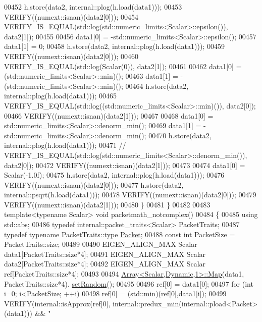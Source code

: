 \begin{DoxyCode}
00452     h.store(data2, internal::plog(h.load(data1)));
00453     VERIFY((numext::isnan)(data2[0]));
00454     VERIFY\_IS\_EQUAL(std::log(std::numeric\_limits<Scalar>::epsilon()), data2[1]);
00455 
00456     data1[0] = -std::numeric\_limits<Scalar>::epsilon();
00457     data1[1] = 0;
00458     h.store(data2, internal::plog(h.load(data1)));
00459     VERIFY((numext::isnan)(data2[0]));
00460     VERIFY\_IS\_EQUAL(std::log(Scalar(0)), data2[1]);
00461 
00462     data1[0] = (std::numeric\_limits<Scalar>::min)();
00463     data1[1] = -(std::numeric\_limits<Scalar>::min)();
00464     h.store(data2, internal::plog(h.load(data1)));
00465     VERIFY\_IS\_EQUAL(std::log((std::numeric\_limits<Scalar>::min)()), data2[0]);
00466     VERIFY((numext::isnan)(data2[1]));
00467 
00468     data1[0] = std::numeric\_limits<Scalar>::denorm\_min();
00469     data1[1] = -std::numeric\_limits<Scalar>::denorm\_min();
00470     h.store(data2, internal::plog(h.load(data1)));
00471     \textcolor{comment}{// VERIFY\_IS\_EQUAL(std::log(std::numeric\_limits<Scalar>::denorm\_min()), data2[0]);}
00472     VERIFY((numext::isnan)(data2[1]));
00473 
00474     data1[0] = Scalar(-1.0f);
00475     h.store(data2, internal::plog(h.load(data1)));
00476     VERIFY((numext::isnan)(data2[0]));
00477     h.store(data2, internal::psqrt(h.load(data1)));
00478     VERIFY((numext::isnan)(data2[0]));
00479     VERIFY((numext::isnan)(data2[1]));
00480   \}
00481 \}
00482 
00483 \textcolor{keyword}{template}<\textcolor{keyword}{typename} Scalar> \textcolor{keywordtype}{void} packetmath\_notcomplex()
00484 \{
00485   \textcolor{keyword}{using} std::abs;
00486   \textcolor{keyword}{typedef} internal::packet\_traits<Scalar> PacketTraits;
00487   \textcolor{keyword}{typedef} \textcolor{keyword}{typename} PacketTraits::type \hyperlink{group___sparse_core___module}{Packet};
00488   \textcolor{keyword}{const} \textcolor{keywordtype}{int} PacketSize = PacketTraits::size;
00489 
00490   EIGEN\_ALIGN\_MAX Scalar data1[PacketTraits::size*4];
00491   EIGEN\_ALIGN\_MAX Scalar data2[PacketTraits::size*4];
00492   EIGEN\_ALIGN\_MAX Scalar ref[PacketTraits::size*4];
00493 
00494   \hyperlink{group___core___module_class_eigen_1_1_array}{Array<Scalar,Dynamic,1>::Map}(data1, PacketTraits::size*4).
      \hyperlink{class_eigen_1_1_plain_object_base_af0e576a0e1aefc9ee346de44cc352ba3}{setRandom}();
00495 
00496   ref[0] = data1[0];
00497   \textcolor{keywordflow}{for} (\textcolor{keywordtype}{int} i=0; i<PacketSize; ++i)
00498     ref[0] = (std::min)(ref[0],data1[i]);
00499   VERIFY(internal::isApprox(ref[0], internal::predux\_min(internal::pload<Packet>(data1))) && \textcolor{stringliteral}{"
}
\end{DoxyCode}
